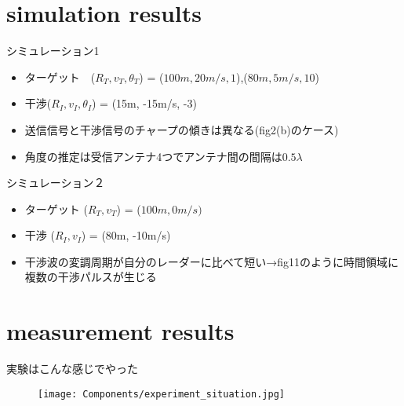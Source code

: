 \section{simulation results}
シミュレーション1
\begin{itemize}
    \item ターゲット　($R_T,v_T, \theta_T$) = ($100m, 20m/s, 1$),($80m, 5m/s, 10$)
    \item 干渉($R_I,v_I, \theta_I$) = (15m, -15m/s, -3)
    \item 送信信号と干渉信号のチャープの傾きは異なる(fig2(b)のケース)
    \item 角度の推定は受信アンテナ4つでアンテナ間の間隔は$0.5\lambda$
\end{itemize}

シミュレーション２
\begin{itemize}
    \item ターゲット ($R_T,v_T$) = ($100m, 0m/s)$
    \item 干渉 ($R_I, v_I$) = (80m, -10m/s)
    \item 干渉波の変調周期が自分のレーダーに比べて短い→fig11のように時間領域に複数の干渉パルスが生じる
\end{itemize}

\section{measurement results}
実験はこんな感じでやった
\begin{figure}[H]
    \centering
    \texttt{[image: Components/experiment\_situation.jpg]}
\end{figure}